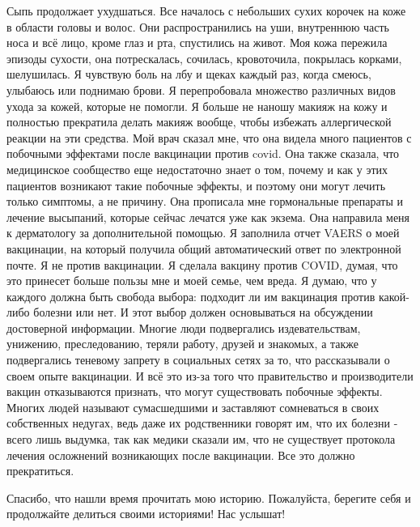 Сыпь продолжает ухудшаться. Все началось с небольших сухих корочек на коже в
области головы и волос. Они распространились на уши, внутреннюю часть носа и всё
лицо, кроме глаз и рта, спустились на живот. Моя кожа пережила эпизоды сухости,
она потрескалась, сочилась, кровоточила, покрылась корками, шелушилась. Я
чувствую боль на лбу и щеках каждый раз, когда смеюсь, улыбаюсь или поднимаю
брови. Я перепробовала множество различных видов ухода за кожей, которые не
помогли. Я больше не наношу макияж на кожу и полностью прекратила делать макияж
вообще, чтобы избежать аллергической реакции на эти средства. Мой врач сказал
мне, что она видела много пациентов с побочными эффектами после вакцинации
против covid. Она также сказала, что медицинское сообщество еще недостаточно
знает о том, почему и как у этих пациентов возникают такие побочные эффекты, и
поэтому они могут лечить только симптомы, а не причину. Она прописала мне
гормональные препараты и лечение высыпаний, которые сейчас лечатся уже как
экзема. Она направила меня к дерматологу за дополнительной помощью. Я заполнила
отчет VAERS о моей вакцинации, на который получила общий автоматический ответ по
электронной почте. Я не против вакцинации. Я сделала вакцину против COVID,
думая, что это принесет больше пользы мне и моей семье, чем вреда. Я думаю, что
у каждого должна быть свобода выбора: подходит ли им вакцинация против
какой-либо болезни или нет. И этот выбор должен основываться на обсуждении
достоверной информации. Многие люди подвергались издевательствам, унижению,
преследованию, теряли работу, друзей и знакомых, а также подвергались теневому
запрету в социальных сетях за то, что рассказывали о своем опыте вакцинации. И
всё это из-за того что правительство и производители вакцин отказываются
признать, что могут существовать побочные эффекты. Многих людей называют
сумасшедшими и заставляют сомневаться в своих собственных недугах, ведь даже их
родственники говорят им, что их болезни - всего лишь выдумка, так как медики
сказали им, что не существует протокола лечения осложнений возникающих после
вакцинации. Все это должно прекратиться.

Спасибо, что нашли время прочитать мою историю. Пожалуйста, берегите себя и
продолжайте делиться своими историями! Нас услышат!

